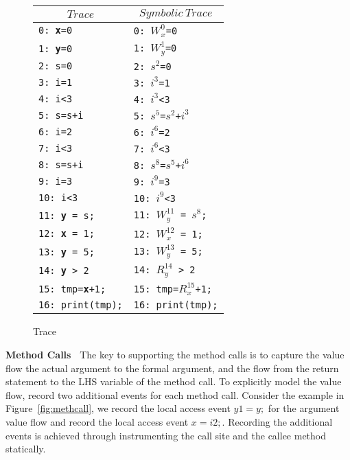 \begin{figure}
\centering
\begin{tabular}{l|l}
\hline
\multicolumn{1}{c}{$Trace$} & \multicolumn{1}{c}{$Symbolic\  Trace$} \\
\hline
{\tt 0: {\bf x}=0} &  {\tt 0: $W^0_x$=0}    \\
{\tt 1: {\bf y}=0} &   {\tt 1: $W^1_y$=0}   \\
{\tt 2: s=0} &  {\tt 2: $s^2$=0}   \\
{\tt 3: i=1} &     {\tt 3: $i^3$=1}   \\
{\tt 4: i<3} &    {\tt 4: $i^3$<3} \\
{\tt 5: s=s+i} & {\tt 5: $s^5$=$s^2$+$i^3$}   \\
{\tt 6: i=2} &       {\tt 6: $i^6$=2}  \\
{\tt 7: i<3} &      {\tt 7: $i^6$<3}  \\
{\tt 8: s=s+i} &  {\tt 8: $s^8$=$s^5$+$i^6$}  \\
{\tt 9: i=3} &     {\tt 9: $i^9$=3}  \\
{\tt 10: i<3} &    {\tt 10: $i^9$<3}  \\
{\tt 11: {\bf y} = s;} &  {\tt 11: $W^{11}_y$ = $s^8$;}  \\
{\tt 12: {\bf x} = 1;} &    {\tt 12: $W^{12}_x$ = 1;}   \\
{\tt 13: {\bf y} = 5;} &    {\tt 13: $W^{13}_y$ = 5;}  \\
{\tt 14: {\bf y} > 2}  &    {\tt 14: $R^{14}_y$ > 2} \\
{\tt 15: tmp={\bf x}+1;}  & {\tt 15: tmp=$R^{15}_x$+1;}   \\	
{\tt 16: print(tmp);} &  {\tt 16: print(tmp);}  \\
\end{tabular}
\caption{Trace}
\label{fig:t4running2}
\end{figure}



{\bf Method Calls\ } The key to supporting the method calls is to capture the value flow the actual argument to the formal argument, and the flow from the return statement to the LHS variable of the method call. To explicitly model the value flow, record two additional events for each method call.
Consider the example in Figure~\ref{fig:methcall},   we record the local access event $y1=y;$ for the argument value flow and record the  local access event $x=i2;$. Recording the additional events is achieved through instrumenting the call site and the callee method statically.  


